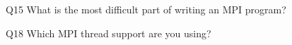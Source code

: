 \begin{description}%
\item{Q15} What is the most difficult part of writing an MPI program?%
\item{Q18} Which MPI thread support are you using?%
\end{description}%
